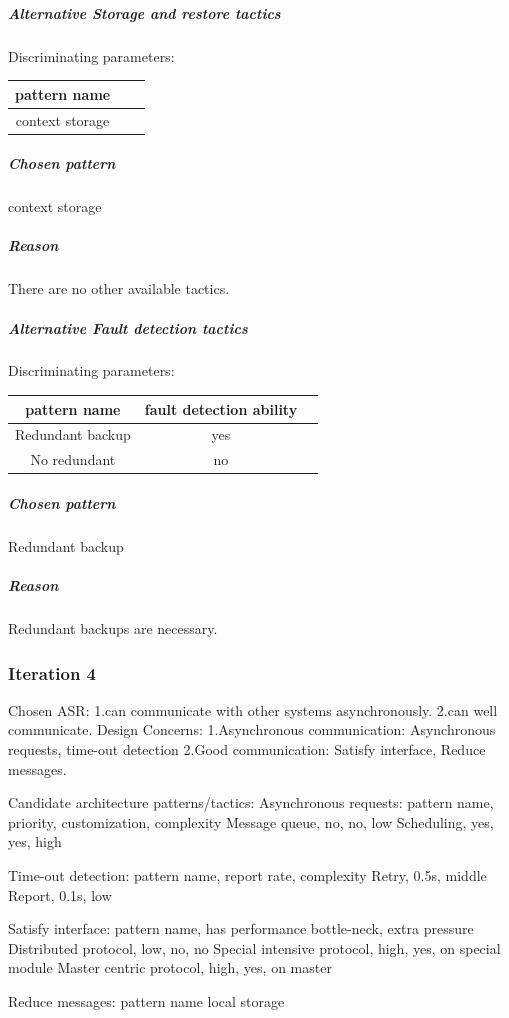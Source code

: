 \documentclass{article}
\begin{document}
		\subparagraph{Alternative Storage and restore tactics}
		Discriminating parameters:\\
		\begin{center}
			\begin{tabular}{|c|c|c|}
				\hline
				pattern name\\
				\hline
				context storage\\
				\hline
			\end{tabular}
		\end{center}
		\subparagraph{Chosen pattern} 
		context storage
		\subparagraph{Reason} 
		There are no other available tactics.

		\subparagraph{Alternative Fault detection tactics}
		Discriminating parameters:\\
		\begin{center}
			\begin{tabular}{|c|c|c|}
				\hline
				pattern name & fault detection ability\\
				\hline
				Redundant backup & yes\\
				\hline
				No redundant& no\\
				\hline
			\end{tabular}
		\end{center}
		\subparagraph{Chosen pattern} 
		Redundant backup
		\subparagraph{Reason} 
		Redundant backups are necessary.

		\subsubsection{Iteration 4}
		Chosen ASR: 
		1.can communicate with other systems asynchronously.
		2.can well communicate.
		Design Concerns:
		1.Asynchronous communication: Asynchronous requests, time-out detection
		2.Good communication: Satisfy interface, Reduce messages.

		Candidate architecture patterns/tactics:
		Asynchronous requests:
			pattern name, priority, customization, complexity
			Message queue, no, no, low
			Scheduling, yes, yes, high
		
		Time-out detection:
			pattern name, report rate, complexity
			Retry, 0.5s, middle
			Report, 0.1s, low
		
		Satisfy interface:
			pattern name, has performance bottle-neck, extra pressure
			Distributed protocol, low, no, no
			Special intensive protocol, high, yes, on special module
			Master centric protocol, high, yes, on master
		
		Reduce messages:
			pattern name
			local storage
		
\end{document}
